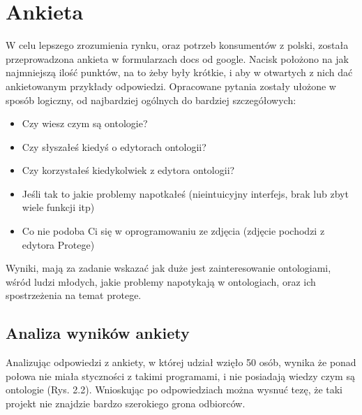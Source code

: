\documentclass[a4paper,12pt, twoside]{book} %
\begin{document}
\section{Ankieta}
W celu lepszego zrozumienia rynku, oraz potrzeb konsumentów z polski, została przeprowadzona ankieta w formularzach docs od google.
Nacisk położono na jak najmniejszą ilość punktów, na to żeby były krótkie, i aby w otwartych z nich dać ankietowanym przykłady odpowiedzi. Opracowane pytania zostały ułożone w sposób logiczny, od najbardziej ogólnych do bardziej szczegółowych:
\begin{itemize}
	\item Czy wiesz czym są ontologie?
	\item Czy słyszałeś kiedyś o edytorach ontologii?
	\item Czy korzystałeś kiedykolwiek z edytora ontologii?
	\item Jeśli tak to jakie problemy napotkałeś (nieintuicyjny interfejs, brak lub zbyt wiele funkcji itp)
	\item Co nie podoba Ci się w oprogramowaniu ze zdjęcia (zdjęcie pochodzi z edytora Protege)
\end{itemize}
Wyniki, mają za zadanie wskazać jak duże jest zainteresowanie ontologiami, wśród ludzi młodych, jakie problemy napotykają w ontologiach, oraz ich spostrzeżenia na temat protege.


\subsection{Analiza wyników ankiety}
 Analizując odpowiedzi z ankiety, w której udział wzięło 50 osób, wynika że ponad połowa nie miała styczności z takimi programami, i nie posiadają wiedzy czym są ontologie (Rys. 2.2). Wnioskując po odpowiedziach można wysnuć tezę, że taki projekt nie znajdzie bardzo szerokiego grona odbiorców. 
 
\end{document}
